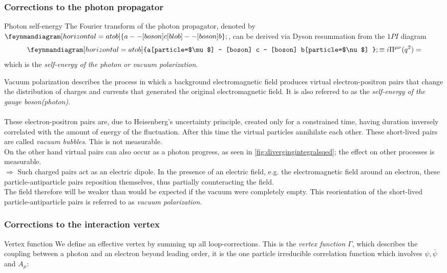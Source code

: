 \subsubsection{Corrections to the photon propagator}
\begin{mybox}{Photon self-energy}
	The Fourier transform of the photon propagator, denoted by $\feynmandiagram[horizontal=a to b]{a --[boson] c [blob] --[boson]b};$, can be derived via Dyson resummation from the $1PI$ diagram 
	\begin{equation}
	\feynmandiagram[horizontal=a to b]{a[particle=$\mu$] -- [boson] c -- [boson] b[particle=$\nu$] };
	\equiv i \Pi^{\mu \nu} (q^2) = 
	\end{equation}
	which is the \emph{self-energy of the photon or vacuum polarization}.
\end{mybox}
Vacuum polarization describes the process in which a background electromagnetic field produces virtual electron-positron pairs that change the distribution of charges and currents that generated the original electromagnetic field. It is also referred to as the \emph{self-energy of the gauge boson(photon)}.\\
\\
These electron-positron pairs are, due to Heisenberg's uncertainty principle, created only for a constrained time, having duration inversely correlated with the amount of energy of the fluctuation. After this time the virtual particles annihilate each other. These short-lived pairs are called \emph{vacuum bubbles}. This is not measurable.\\
On the other hand virtual pairs can also occur as a photon progress, as seen in \ref{fig:divergingintegralsqed}; the effect on other processes is measurable.\\
$\Rightarrow$ Such charged pairs act as an electric dipole. In the presence of an electric field, e.g. the electromagnetic field around an electron, these particle-antiparticle pairs reposition themselves, thus partially counteracting the field.\\
The field therefore will be weaker than would be expected if the vacuum were completely empty. This reorientation of the short-lived particle-antiparticle pairs is referred to as  \emph{vacuum polarization}.

\subsubsection{Corrections to the interaction vertex}
\begin{mybox}{Vertex function}
	We define an effective vertex by summing up all loop-corrections. This is the \emph{vertex function} $\Gamma$, which describes the coupling between a photon and an electron beyond leading order, it is the one particle irreducible correlation function which involves $ \psi, \bar{\psi}$ and $A_{\mu}$:
	
\end{mybox}

